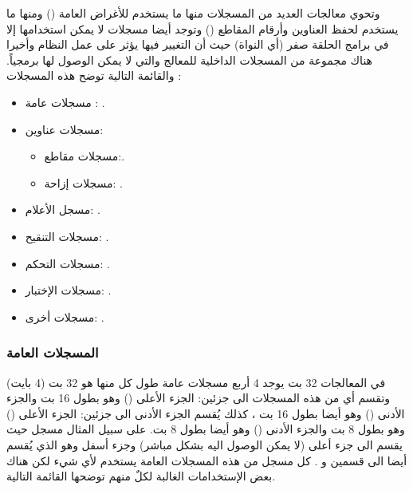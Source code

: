 \documentclass[document.tex]{subfiles}
\begin{document}
وتحوي معالجات  العديد من المسجلات منها ما يستخدم للأغراض العامة ()  ومنها ما يستخدم لحفظ العناوين وأرقام المقاطع () وتوجد أيضا مسجلات لا يمكن استخدامها إلا في برامج الحلقة صفر (أي النواة) حيث أن التغيير فيها يؤثر على عمل النظام وأخيرا هناك مجموعة من المسجلات الداخلية للمعالج والتي لا يمكن الوصول لها برمجياً. والقائمة التالية توضح هذه المسجلات :

\begin{itemize}
\item مسجلات عامة : .
\item مسجلات عناوين:
\begin{itemize}
\item مسجلات مقاطع:.
\item مسجلات إزاحة: .
\end{itemize}
\item مسجل الأعلام: .
\item مسجلات التنقيح: .
\item مسجلات التحكم: .
\item مسجلات الإختبار: .
\item مسجلات أخرى: .
\end{itemize}

\subsubsection{المسجلات العامة }
في المعالجات 32 بت يوجد 4 أربع مسجلات عامة طول كل منها هو 32 بت (4 بايت) وتقسم أي من هذه المسجلات الى جزئين: الجزء الأعلى () وهو بطول 16 بت والجزء الأدنى () وهو أيضا بطول 16 بت ، كذلك يُقسم الجزء الأدنى الى جزئين: الجزء الأعلى () وهو بطول 8 بت والجزء الأدنى () وهو أيضا بطول 8 بت. على سبيل المثال مسجل  حيث يقسم الى جزء أعلى (لا يمكن الوصول اليه بشكل مباشر) وجزء أسفل وهو   الذي يُقسم أيضا الى قسمين  و . كل مسجل من هذه المسجلات العامة يستخدم لأي شيء لكن هناك بعض الإستخدامات الغالبة لكلٌ منهم توضحها القائمة التالية.
\end{document}
